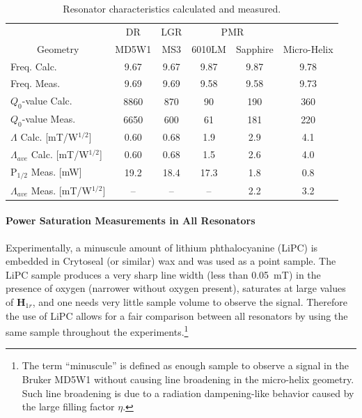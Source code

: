 \begin{table}[htb]
\centering
\caption[Resonator characteristics calculated and measured.]{Resonator characteristics calculated and measured.}
\label{table:chars}
\begin{tabular}{l|c|c|c|c|c}
\multicolumn{1}{l}{} & DR & LGR & \multicolumn{2}{c|}{PMR} &  \\
\multicolumn{1}{c||}{Geometry} & MD5W1 & MS3 & 6010LM & Sapphire & Micro-Helix \\ \hline \hline
\multicolumn{1}{l||}{Freq. Calc.} & \multicolumn{1}{c|}{9.67} & \multicolumn{1}{c|}{9.67} & \multicolumn{1}{c|}{9.87} & \multicolumn{1}{c|}{9.87} & 9.78 \\ \hline 
\multicolumn{1}{l||}{Freq. Meas.} & \multicolumn{1}{c|}{9.69} & \multicolumn{1}{c|}{9.69} & \multicolumn{1}{c|}{9.58} & \multicolumn{1}{c|}{9.58} & 9.73 \\ \hline 
\multicolumn{1}{l||}{$Q_0$-value Calc.} & \multicolumn{1}{c|}{8860} & \multicolumn{1}{c|}{870} & \multicolumn{1}{c|}{90} & \multicolumn{1}{c|}{190} & 360 \\ \hline 
\multicolumn{1}{l||}{$Q_0$-value Meas.} & \multicolumn{1}{c|}{6650} & \multicolumn{1}{c|}{600} & \multicolumn{1}{c|}{61} & \multicolumn{1}{c|}{181} & 220 \\ \hline
\multicolumn{1}{l||}{$\Lambda$ Calc. {[}mT/W$^{1/2}${]}} & \multicolumn{1}{c|}{0.60} & \multicolumn{1}{c|}{0.68} & \multicolumn{1}{c|}{1.9} & \multicolumn{1}{c|}{2.9} & 4.1 \\ \hline 
\multicolumn{1}{l||}{$\Lambda_{ave}$ Calc. {[}mT/W$^{1/2}${]}} & \multicolumn{1}{c|}{0.60} & \multicolumn{1}{c|}{0.68} & \multicolumn{1}{c|}{1.5} & \multicolumn{1}{c|}{2.6} & 4.0 \\ \hline 
\multicolumn{1}{l||}{P$_{1/2}$ Meas. {[}mW{]}} & \multicolumn{1}{c|}{19.2} & \multicolumn{1}{c|}{18.4} & \multicolumn{1}{c|}{17.3} & \multicolumn{1}{c|}{1.8} & 0.8 \\ \hline 
\multicolumn{1}{l||}{$\Lambda_{ave}$ Meas. {[}mT/W$^{1/2}${]}} & \multicolumn{1}{c|}{–} & \multicolumn{1}{c|}{–} & \multicolumn{1}{c|}{–} & \multicolumn{1}{c|}{2.2} & 3.2
\end{tabular}
\end{table}

\paragraph{Power Saturation Measurements in All Resonators}
Experimentally, a minuscule amount of lithium phthalocyanine (LiPC)\cite{Liu5438} is embedded in Crytoseal (or similar) wax and was used as a point sample. The LiPC sample produces a very sharp line width (less than 0.05~mT) in the presence of oxygen (narrower without oxygen present), saturates at large values of ${\mathbf H}_{1r}$, and one needs very little sample volume to observe the signal. Therefore the use of LiPC allows for a fair comparison between all resonators by using the same sample throughout the experiments.\footnote{The term ``minuscule'' is defined as enough sample to observe a signal in the Bruker MD5W1 without causing line broadening in the micro-helix geometry. Such line broadening is due to a radiation dampening-like behavior caused by the large filling factor $\eta$.}

